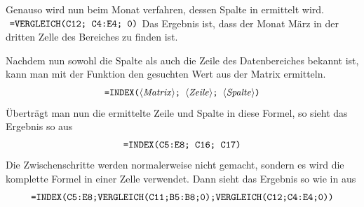 \vspace{0.5cm}
\begin{figwindow}

Genauso wird nun beim Monat verfahren, dessen Spalte in   ermittelt wird.
$ \text{ {\texttt{=VERGLEICH(C12; C4:E4; 0)}}} $
%
Das Ergebnis ist, dass der Monat März in der dritten Zelle des Bereiches  zu finden ist.
\end{figwindow} 
\vspace{2.5cm}
%
Nachdem nun sowohl die Spalte als auch die Zeile des Datenbereiches bekannt ist, kann man mit der Funktion  den gesuchten Wert aus der Matrix ermitteln.
%
$$ \text{\stmt{=INDEX(\syntax{Matrix}; \syntax{Zeile}; \syntax{Spalte})}} $$%
%
Überträgt man nun die ermittelte Zeile und Spalte in diese Formel, so sieht das Ergebnis so aus
%
$$ \text{\texttt{=INDEX(C5:E8; C16; C17)}} $$
%
Die Zwischenschritte werden normalerweise nicht gemacht, sondern es wird die komplette Formel in einer Zelle verwendet. Dann sieht das Ergebnis so wie in  aus
%
$$ \text{\texttt{=INDEX(C5:E8;VERGLEICH(C11;B5:B8;0);VERGLEICH(C12;C4:E4;0))}} $$%
%